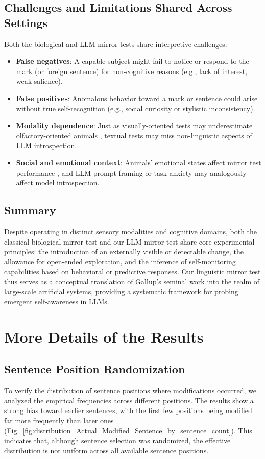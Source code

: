 \documentclass{article}
\begin{document}
\subsection{Challenges and Limitations Shared Across Settings}

Both the biological and LLM mirror tests share interpretive challenges:
\begin{itemize}
    \item \textbf{False negatives}: A capable subject might fail to notice or respond to the mark (or foreign sentence) for non-cognitive reasons (e.g., lack of interest, weak salience).
    \item \textbf{False positives}: Anomalous behavior toward a mark or sentence could arise without true self-recognition (e.g., social curiosity or stylistic inconsistency).
    \item \textbf{Modality dependence}: Just as visually-oriented tests may underestimate olfactory-oriented animals \citep{horowitz2017smelling}, textual tests may miss non-linguistic aspects of LLM introspection.
    \item \textbf{Social and emotional context}: Animals' emotional states affect mirror test performance \citep{suarez1981self}, and LLM prompt framing or task anxiety may analogously affect model introspection.
\end{itemize}

\subsection{Summary}

Despite operating in distinct sensory modalities and cognitive domains, both the classical biological mirror test and our LLM mirror test share core experimental principles: the introduction of an externally visible or detectable change, the allowance for open-ended exploration, and the inference of self-monitoring capabilities based on behavioral or predictive responses. Our linguistic mirror test thus serves as a conceptual translation of Gallup’s seminal work into the realm of large-scale artificial systems, providing a systematic framework for probing emergent self-awareness in LLMs.



\section{More Details of the Results}
\label{moredetails}


\subsection{Sentence Position Randomization}
To verify the distribution of sentence positions where modifications occurred, we analyzed the empirical frequencies across different positions. The results show a strong bias toward earlier sentences, with the first few positions being modified far more frequently than later ones (Fig.~\ref{fig:distribution_Actual_Modified_Sentence_by_sentence_count}). 
This indicates that, although sentence selection was randomized, the effective distribution is not uniform across all available sentence positions.
\end{document}
